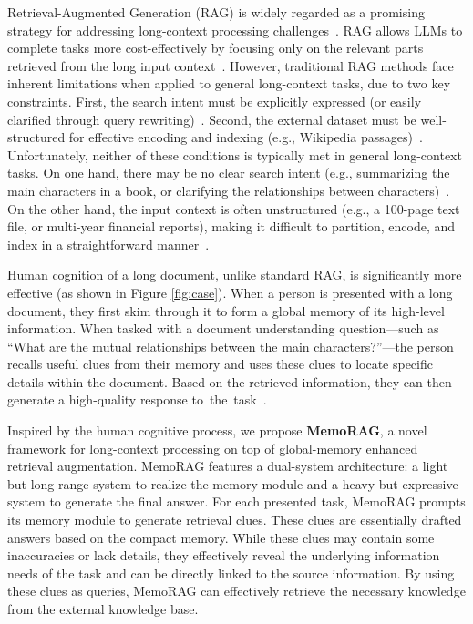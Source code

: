 \documentclass[sigconf]{acmart}
\begin{document}
Retrieval-Augmented Generation (RAG) is widely regarded as a promising strategy for addressing long-context processing challenges~\cite{izacard2021leveraging,gao2024retrievalaugmented}. RAG allows LLMs to complete tasks more cost-effectively by focusing only on the relevant parts retrieved from the long input context~\cite{longctx, zhu2024largelanguagemodelsinformation}.
However, traditional RAG methods face inherent limitations when applied to general long-context tasks, due to two key constraints.
First, the search intent must be explicitly expressed (or easily clarified through query rewriting)~\cite{chan2024rqraglearningrefinequeries,zhu2024largelanguagemodelsinformation}. Second, the external dataset must be well-structured for effective encoding and indexing (e.g., Wikipedia passages)~\cite{bajaj2016ms,Metzler_2021}. Unfortunately, neither of these conditions is typically met in general long-context tasks.
On one hand, there may be no clear search intent (e.g., summarizing the main characters in a book, or clarifying the relationships between characters)~\cite{edge2024localglobalgraphrag, qian2024longllmsnecessitylongcontexttasks}. On the other hand, the input context is often unstructured (e.g., a 100-page text file, or multi-year financial reports), making it difficult to partition, encode, and index in a straightforward manner~\cite{ICRALM, qian2024grounding, zhu2024largelanguagemodelsinformation}.


Human cognition of a long document, unlike standard RAG, is significantly more effective (as shown in Figure \ref{fig:case}). When a person is presented with a long document, they first skim through it to form a global memory of its high-level information. When tasked with a document understanding question—such as “What are the mutual relationships between the main characters?”—the person recalls useful clues from their memory and uses these clues to locate specific details within the document. Based on the retrieved information, they can then generate a high-quality response to~the~task~\cite{adolphs1999social}.

Inspired by the human cognitive process, we propose \textbf{MemoRAG}, a novel framework for long-context processing on top of global-memory enhanced retrieval augmentation. MemoRAG features a dual-system architecture: a light but long-range system to realize the memory module and a heavy but expressive system to generate the final answer. For each presented task, MemoRAG prompts its memory module to generate retrieval clues. These clues are essentially drafted answers based on the compact memory. While these clues may contain some inaccuracies or lack details, they effectively reveal the underlying information needs of the task and can be directly linked to the source information. By using these clues as queries, MemoRAG can effectively retrieve the necessary knowledge from the external knowledge base.  
\end{document}
